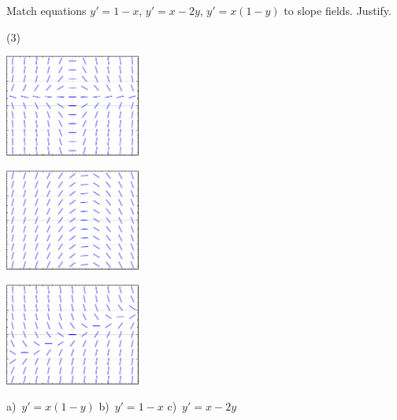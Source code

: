 \begin{exercise}
Match equations $y'=1-x$, $y'=x-2y$, $y' = x(1-y)$ to slope fields.
Justify.
\begin{tasks}(3)
\task
\parbox[c]{1.75in}{\includegraphics[width=1.75in]{figures/yprimex1minusyslope}}
\task
\parbox[c]{1.75in}{\includegraphics[width=1.75in]{figures/yprime1minusxslope}}
\task
\parbox[c]{1.75in}{\includegraphics[width=1.75in]{figures/yprimexminus2yslope}}
\end{tasks}
\end{exercise}
\comboSol{%
}
{%
a)~$y' = x(1-y)$ \quad b)~$y' = 1-x$ \quad c)~$y'=x-2y$
}


